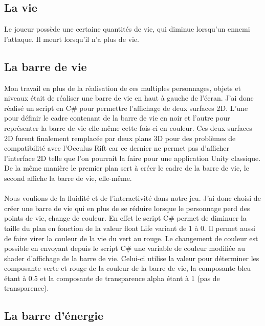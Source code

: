 \documentclass[12pt]{article}
\begin{document}
\subsection{La vie}

Le joueur possède une certaine quantités de vie, qui diminue lorsqu'un ennemi l'attaque. Il meurt lorsqu'il n'a plus de vie.

\subsection{La barre de vie}

Mon travail en plus de la réalisation de ces multiples personnages, objets et niveaux était de réaliser une barre de vie en haut à gauche de l’écran. J’ai donc réalisé un script en C\# pour permettre l’affichage de deux surfaces 2D. L’une pour définir le cadre contenant de la barre de vie en noir et l’autre pour représenter la barre de vie elle-même cette fois-ci en couleur. Ces deux surfaces 2D furent finalement remplacée par deux plans 3D pour des problèmes de compatibilité avec l’Occulus Rift car ce dernier ne permet pas d’afficher l’interface 2D telle que l’on pourrait la faire pour une application Unity classique. De la même manière le premier plan sert à créer le cadre de la barre de vie, le second affiche la barre de vie, elle-même.\\ \\
Nous voulions de la fluidité et de l’interactivité dans notre jeu. J’ai donc choisi de créer une barre de vie qui en plus de se réduire lorsque le personnage perd des points de vie, change de couleur. En effet le script C\# permet de diminuer la taille du plan en fonction de la valeur float Life variant de 1 à 0. Il permet aussi de faire virer la couleur de la vie du vert au rouge. Le changement de couleur est possible en envoyant depuis le script C\# une variable de couleur modifiée au shader d’affichage de la barre de vie. Celui-ci utilise la valeur pour déterminer les composante verte et rouge de la couleur de la barre de vie, la composante bleu étant à 0.5 et la composante de transparence alpha étant à 1 (pas de transparence).

\subsection{La barre d'énergie}
\end{document}
